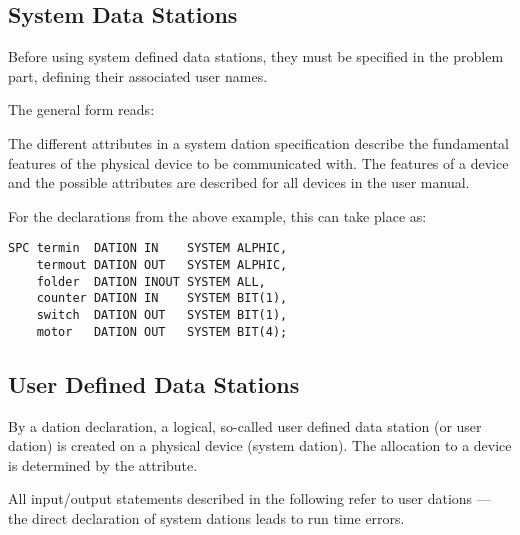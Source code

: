 \subsection{System Data Stations}   %

Before using system defined data stations, they must be specified in the
problem part, defining their associated user names. 

The general form reads:

\begin{grammarframe}


\end{grammarframe}

The different attributes in a system dation specification describe the
fundamental features of the physical device to be communicated with. The
features of a device and the possible attributes are described for all
devices in the user manual.

For the declarations from the above example, this can take place as:

\begin{lstlisting}
SPC termin  DATION IN    SYSTEM ALPHIC,
    termout DATION OUT   SYSTEM ALPHIC,
    folder  DATION INOUT SYSTEM ALL,   
    counter DATION IN    SYSTEM BIT(1),
    switch  DATION OUT   SYSTEM BIT(1),
    motor   DATION OUT   SYSTEM BIT(4);
\end{lstlisting}


\subsection{User Defined Data Stations}    %

By a dation declaration, a logical, so-called user defined data station
(or user dation) is created on a physical device (system dation). The
allocation to a device is determined by the 
  attribute.

All input/output statements described in the following refer to user
dations --- the direct declaration of system dations leads to run time
errors.

\begin{grammarframe}

\end{grammarframe}

